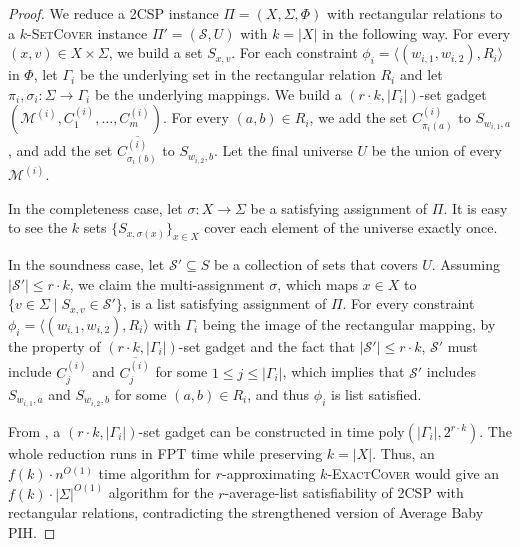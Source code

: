 \documentclass[10pt,a4paper]{article}
\newcommand{\kexact}{\textsc{$k$-ExactCover}}
\newcommand{\ksetcover}{\textsc{$k$-SetCover}}
\begin{document}
\begin{proof}
We reduce a 2CSP instance $\Pi=(X,\Sigma,\Phi)$ with rectangular relations to a \ksetcover{} instance $\Pi'=(\mathcal S,U)$ with $k=|X|$ in the following way. For every $(x,v) \in X \times \Sigma$, we build a set $S_{x,v}$. For each constraint $\phi_i=\langle (w_{i,1},w_{i,2}),R_i\rangle$ in $\Phi$, let $\Gamma_i$ be the underlying set in the rectangular relation $R_i$ and let $\pi_i,\sigma_i:\Sigma\to \Gamma_i$ be the underlying mappings. We build a $(r \cdot k,|\Gamma_i|)$-set gadget $(\mathcal M^{(i)},C_1^{(i)},\ldots,C_m^{(i)})$. For every $(a,b) \in R_i$, we add the set $C_{\pi_i(a)}^{(i)}$ to $S_{w_{i,1},a}$, and add the set $\overline{C_{\sigma_i(b)}^{(i)}}$ to $S_{w_{i,2},b}$. Let the final universe $U$ be the union of every $\mathcal M^{(i)}$.


In the completeness case, let $\sigma:X \to \Sigma$ be a satisfying assignment of $\Pi$. It is easy to see the $k$ sets $\{S_{x,\sigma(x)}\}_{x \in X}$ cover each element of the universe exactly once.

In the soundness case, let $\mathcal S' \subseteq S$ be a collection of sets that covers $U$. Assuming $|\mathcal S'| \le r \cdot k$, we claim the multi-assignment $\sigma$, which maps $x \in X$ to $\{v \in \Sigma \mid S_{x,v} \in \mathcal S'\}$, is a list satisfying assignment of $\Pi$. For every constraint $\phi_i=\langle (w_{i,1},w_{i,2}),R_i\rangle$ with $\Gamma_i$ being the image of the rectangular mapping, by the property of $(r\cdot k,|\Gamma_i|)$-set gadget and the fact that $|\mathcal S'|\le r \cdot k$, $\mathcal S'$ must include $C_{j}^{(i)}$ and $\overline{C_j^{(i)}}$ for some $1 \le j \le |\Gamma_i|$, which implies that $\mathcal S'$ includes $S_{w_{i,1},a}$ and $S_{w_{i,2},b}$ for some $(a,b) \in R_i$, and thus $\phi_i$ is list satisfied.


From , a $(r\cdot k,|\Gamma_i|)$-set gadget can be constructed in time $\text{poly}(|\Gamma_i|,2^{r \cdot k})$. The whole reduction runs in FPT time while preserving $k=|X|$. Thus, an $f(k)\cdot n^{O(1)}$ time algorithm for $r$-approximating \kexact{} would give an $f(k)\cdot |\Sigma|^{O(1)}$ algorithm for the $r$-average-list satisfiability of 2CSP with rectangular relations, contradicting the strengthened version of Average Baby PIH.
\end{proof}
\end{document}
